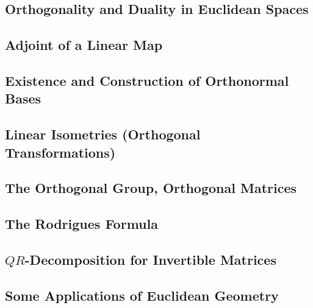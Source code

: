 \documentclass[a4paper]{article}
\begin{document}
\subsection{ Orthogonality and Duality in Euclidean Spaces} %

\subsection{ Adjoint of a Linear Map} %

\subsection{ Existence and Construction of Orthonormal Bases} %

\subsection{ Linear Isometries (Orthogonal Transformations)} %

\subsection{ The Orthogonal Group, Orthogonal Matrices} %

\subsection{ The Rodrigues Formula} %

\subsection{ $QR$-Decomposition for Invertible Matrices} %

\subsection{ Some Applications of Euclidean Geometry} %
\end{document}

